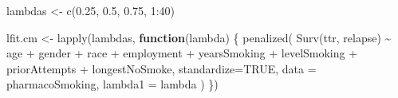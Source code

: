 \documentclass[
]{article}
\newenvironment{Shaded}{\begin{snugshade}}{\end{snugshade}}
\newcommand{\AttributeTok}[1]{\textcolor[rgb]{0.77,0.63,0.00}{#1}}
\newcommand{\ConstantTok}[1]{\textcolor[rgb]{0.00,0.00,0.00}{#1}}
\newcommand{\ControlFlowTok}[1]{\textcolor[rgb]{0.13,0.29,0.53}{\textbf{#1}}}
\newcommand{\DecValTok}[1]{\textcolor[rgb]{0.00,0.00,0.81}{#1}}
\newcommand{\FloatTok}[1]{\textcolor[rgb]{0.00,0.00,0.81}{#1}}
\newcommand{\FunctionTok}[1]{\textcolor[rgb]{0.00,0.00,0.00}{#1}}
\newcommand{\NormalTok}[1]{#1}
\newcommand{\OtherTok}[1]{\textcolor[rgb]{0.56,0.35,0.01}{#1}}
\newcommand{\SpecialCharTok}[1]{\textcolor[rgb]{0.00,0.00,0.00}{#1}}
\begin{document}
\begin{Shaded}
\begin{Highlighting}[]
\NormalTok{lambdas }\OtherTok{\textless{}{-}} \FunctionTok{c}\NormalTok{(}\FloatTok{0.25}\NormalTok{, }\FloatTok{0.5}\NormalTok{, }\FloatTok{0.75}\NormalTok{, }\DecValTok{1}\SpecialCharTok{:}\DecValTok{40}\NormalTok{)}

\NormalTok{lfit.cm }\OtherTok{\textless{}{-}} \FunctionTok{lapply}\NormalTok{(lambdas, }\ControlFlowTok{function}\NormalTok{(lambda) \{}
  \FunctionTok{penalized}\NormalTok{(}
    \FunctionTok{Surv}\NormalTok{(ttr, relapse) }\SpecialCharTok{\textasciitilde{}}\NormalTok{ age }\SpecialCharTok{+}\NormalTok{ gender }\SpecialCharTok{+}\NormalTok{ race }\SpecialCharTok{+} 
\NormalTok{      employment }\SpecialCharTok{+}\NormalTok{ yearsSmoking }\SpecialCharTok{+}\NormalTok{ levelSmoking }\SpecialCharTok{+} 
\NormalTok{      priorAttempts }\SpecialCharTok{+}\NormalTok{ longestNoSmoke, }
    \AttributeTok{standardize=}\ConstantTok{TRUE}\NormalTok{,}
    \AttributeTok{data =}\NormalTok{ pharmacoSmoking,}
    \AttributeTok{lambda1 =}\NormalTok{ lambda}
\NormalTok{  )}
\NormalTok{\})}
\end{Highlighting}
\end{Shaded}
\end{document}
